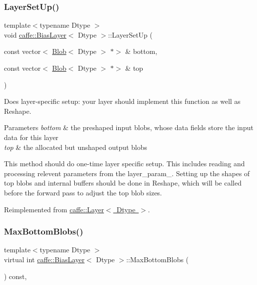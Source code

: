 \subsubsection{\texorpdfstring{Layer\+Set\+Up()}{LayerSetUp()}\hspace{0.1cm}{\footnotesize\ttfamily [2/2]}}
{\footnotesize\ttfamily template$<$typename Dtype $>$ \\
void \mbox{\hyperlink{classcaffe_1_1_bias_layer}{caffe\+::\+Bias\+Layer}}$<$ Dtype $>$\+::Layer\+Set\+Up (\begin{DoxyParamCaption}\item[{const vector$<$ \mbox{\hyperlink{classcaffe_1_1_blob}{Blob}}$<$ Dtype $>$ $\ast$$>$ \&}]{bottom,  }\item[{const vector$<$ \mbox{\hyperlink{classcaffe_1_1_blob}{Blob}}$<$ Dtype $>$ $\ast$$>$ \&}]{top }\end{DoxyParamCaption})\hspace{0.3cm}{\ttfamily [virtual]}}



Does layer-\/specific setup\+: your layer should implement this function as well as Reshape. 


\begin{DoxyParams}{Parameters}
{\em bottom} & the preshaped input blobs, whose data fields store the input data for this layer \\
\hline
{\em top} & the allocated but unshaped output blobs\\
\hline
\end{DoxyParams}
This method should do one-\/time layer specific setup. This includes reading and processing relevent parameters from the {\ttfamily layer\+\_\+param\+\_\+}. Setting up the shapes of top blobs and internal buffers should be done in {\ttfamily Reshape}, which will be called before the forward pass to adjust the top blob sizes. 

Reimplemented from \mbox{\hyperlink{classcaffe_1_1_layer_a481323a3e0972c682787f2137468c29f}{caffe\+::\+Layer$<$ Dtype $>$}}.

\mbox{\label{classcaffe_1_1_bias_layer_abdb89e3bc940f999d1d4da83de90a97c}} 
\subsubsection{\texorpdfstring{Max\+Bottom\+Blobs()}{MaxBottomBlobs()}\hspace{0.1cm}{\footnotesize\ttfamily [1/2]}}
{\footnotesize\ttfamily template$<$typename Dtype $>$ \\
virtual int \mbox{\hyperlink{classcaffe_1_1_bias_layer}{caffe\+::\+Bias\+Layer}}$<$ Dtype $>$\+::Max\+Bottom\+Blobs (\begin{DoxyParamCaption}{ }\end{DoxyParamCaption}) const\hspace{0.3cm}{\ttfamily [inline]}, {\ttfamily [virtual]}}



